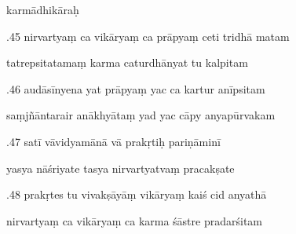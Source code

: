 \documentclass[article,12pt,a4paper]{memoir}%
\newcounter{parCount}
\begin{document}
	  
	

	  
	  \pstart \leavevmode%
	karmādhikāraḥ 
	{}
	\pend%
      

	  
	  \pstart {}.45 nirvartyaṃ ca vikāryaṃ ca prāpyaṃ ceti tridhā matam 
	{}
	\pend%
      

	  
	  \pstart \leavevmode%
	tatrepsitatamaṃ karma caturdhānyat tu kalpitam 
	{}
	\pend%
      

	  
	  \pstart {}.46 audāsīnyena yat prāpyaṃ yac ca kartur anīpsitam 
	{}
	\pend%
      

	  
	  \pstart \leavevmode%
	saṃjñāntarair anākhyātaṃ yad yac cāpy anyapūrvakam 
	{}
	\pend%
      

	  
	  \pstart {}.47 satī vāvidyamānā vā prakṛtiḥ pariṇāminī 
	{}
	\pend%
      

	  
	  \pstart \leavevmode%
	yasya nāśriyate tasya nirvartyatvaṃ pracakṣate 
	{}
	\pend%
      

	  
	  \pstart {}.48 prakṛtes tu vivakṣāyāṃ vikāryaṃ kaiś cid anyathā 
	{}
	\pend%
      

	  
	  \pstart \leavevmode%
	nirvartyaṃ ca vikāryaṃ ca karma śāstre pradarśitam 
	{}
	\pend%
      
\end{document}
